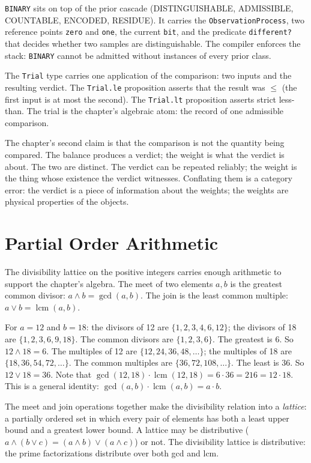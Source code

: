\texttt{BINARY} sits on top of the prior cascade (DISTINGUISHABLE,
ADMISSIBLE, COUNTABLE, ENCODED, RESIDUE). It carries the
\texttt{ObservationProcess}, two reference points \texttt{zero}
and \texttt{one}, the current \texttt{bit}, and the predicate
\texttt{different?} that decides whether two samples are
distinguishable. The compiler enforces the stack: \texttt{BINARY}
cannot be admitted without instances of every prior class.

The \texttt{Trial} type carries one application of the comparison:
two inputs and the resulting verdict. The \texttt{Trial.le}
proposition asserts that the result was $\le$ (the first input is
at most the second). The \texttt{Trial.lt} proposition asserts
strict less-than. The trial is the chapter's algebraic atom: the
record of one admissible comparison.

The chapter's second claim is that the comparison is not the
quantity being compared. The balance produces a verdict; the
weight is what the verdict is about. The two are distinct. The
verdict can be repeated reliably; the weight is the thing whose
existence the verdict witnesses. Conflating them is a category
error: the verdict is a piece of information about the weights;
the weights are physical properties of the objects.

\section{Partial Order Arithmetic}
\label{se:partial-order-arithmetic}

The divisibility lattice on the positive integers carries enough
arithmetic to support the chapter's algebra. The meet of two elements
$a, b$ is the greatest common divisor: $a \wedge b = \gcd(a, b)$. The
join is the least common multiple: $a \vee b = \operatorname{lcm}(a, b)$.

For $a = 12$ and $b = 18$: the divisors of 12 are $\{1, 2, 3, 4, 6,
12\}$; the divisors of 18 are $\{1, 2, 3, 6, 9, 18\}$. The common
divisors are $\{1, 2, 3, 6\}$. The greatest is $6$. So $12 \wedge 18 =
6$. The multiples of 12 are $\{12, 24, 36, 48, \ldots\}$; the
multiples of 18 are $\{18, 36, 54, 72, \ldots\}$. The common multiples
are $\{36, 72, 108, \ldots\}$. The least is $36$. So $12 \vee 18 =
36$. Note that $\gcd(12,18) \cdot \operatorname{lcm}(12,18) = 6 \cdot
36 = 216 = 12 \cdot 18$. This is a general identity:
$\gcd(a,b) \cdot \operatorname{lcm}(a,b) = a \cdot b$.

The meet and join operations together make the divisibility relation
into a \emph{lattice}: a partially ordered set in which every pair of
elements has both a least upper bound and a greatest lower bound. A
lattice may be distributive ($a \wedge (b \vee c) = (a \wedge b) \vee
(a \wedge c)$) or not. The divisibility lattice is distributive: the
prime factorizations distribute over both gcd and lcm.

